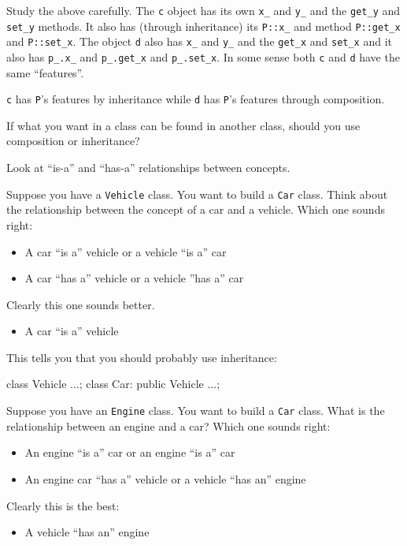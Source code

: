 Study the above carefully. The \verb!c! object has its own \verb!x_!
and \verb!y_! and the \verb!get_y! and \verb!set_y! methods. It also
has (through inheritance) its \verb!P::x_! and method \verb!P::get_x!
and \verb!P::set_x!. The object \verb!d! also has \verb!x_! and
\verb!y_! and the \verb!get_x! and \verb!set_x! and it also has
\verb!p_.x_! and \verb!p_.get_x! and \verb!p_.set_x!. In some
sense both \verb!c! and \verb!d! have the same ``features''.

\verb!c! has \verb!P!'s features by inheritance while \verb!d! has
\verb!P!'s features through composition.

If what you want in a class can be found in another class, should you
use composition or inheritance?

Look at ``is-a'' and ``has-a'' relationships between concepts.

Suppose you have a \verb!Vehicle! class. You want to build a \verb!Car!
class. Think about the relationship between the concept of a car and a
vehicle. Which one sounds right:

\begin{itemize}
\item
  A car ``is a'' vehicle or a vehicle ``is a'' car
\item
  A car ``has a'' vehicle or a vehicle ''has a'' car
\end{itemize}

Clearly this one sounds better.

\begin{itemize}
\item
  A car ``is a'' vehicle
\end{itemize}

This tells you that you should probably use inheritance:
\begin{console}
class Vehicle {...};
class Car: public Vehicle {...};
\end{console}

Suppose you have an \verb!Engine! class. You want to build a \verb!Car!
class. What is the relationship between an engine and a car? Which one
sounds right:

\begin{itemize}
\item
  An engine ``is a'' car or an engine ``is a'' car
\item
  An engine car ``has a'' vehicle or a vehicle ``has an'' engine
\end{itemize}

Clearly this is the best:
\begin{itemize}
\item
  A vehicle ``has an'' engine
\end{itemize}

